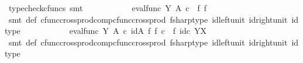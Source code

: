 \begin{isabellebody}
\ {\isacharparenleft}{\kern0pt}typecheck{\isacharunderscore}{\kern0pt}cfuncs{\isacharcomma}{\kern0pt}\ smt{\isacharparenright}{\kern0pt}\isanewline
\ \ \ \ \ \ \isamarkupfalse%
\ \isamarkupfalse%
\ {\isachardoublequoteopen}{\isachardot}{\kern0pt}{\isachardot}{\kern0pt}{\isachardot}{\kern0pt}\ {\isacharequal}{\kern0pt}\ eval{\isacharunderscore}{\kern0pt}func\ Y\ A\ {\isasymcirc}\isactrlsub c\ {\isacharparenleft}{\kern0pt}{\isasymphi}\ {\isasymtimes}\isactrlsub f\ f\isactrlsup {\isasymsharp}{\isacharparenright}{\kern0pt}{\isachardoublequoteclose}\isanewline
\ \ \ \ \ \ \ \ \isamarkupfalse%
\ {\isacharparenleft}{\kern0pt}smt\ {\isasymphi}{\isacharunderscore}{\kern0pt}def\ cfunc{\isacharunderscore}{\kern0pt}cross{\isacharunderscore}{\kern0pt}prod{\isacharunderscore}{\kern0pt}comp{\isacharunderscore}{\kern0pt}cfunc{\isacharunderscore}{\kern0pt}cross{\isacharunderscore}{\kern0pt}prod\ fsharp{\isacharunderscore}{\kern0pt}type\ id{\isacharunderscore}{\kern0pt}left{\isacharunderscore}{\kern0pt}unit{}\ id{\isacharunderscore}{\kern0pt}right{\isacharunderscore}{\kern0pt}unit{}\ id{\isacharunderscore}{\kern0pt}type{\isacharparenright}{\kern0pt}\isanewline
\ \ \ \ \ \ \isamarkupfalse%
\ \isamarkupfalse%
\ {\isachardoublequoteopen}{\isachardot}{\kern0pt}{\isachardot}{\kern0pt}{\isachardot}{\kern0pt}\ {\isacharequal}{\kern0pt}\ eval{\isacharunderscore}{\kern0pt}func\ Y\ A\ {\isasymcirc}\isactrlsub c\ {\isacharparenleft}{\kern0pt}id{\isacharparenleft}{\kern0pt}A{\isacharparenright}{\kern0pt}\ {\isasymtimes}\isactrlsub f\ f\isactrlsup {\isasymsharp}{\isacharparenright}{\kern0pt}\ {\isasymcirc}\isactrlsub c\ {\isacharparenleft}{\kern0pt}{\isasymphi}\ {\isasymtimes}\isactrlsub f\ id\isactrlsub c\ {\isacharparenleft}{\kern0pt}Y\isactrlbsup X\isactrlesup {\isacharparenright}{\kern0pt}{\isacharparenright}{\kern0pt}{\isachardoublequoteclose}\isanewline
\ \ \ \ \ \ \ \ \isamarkupfalse%
\ {\isacharparenleft}{\kern0pt}smt\ {\isasymphi}{\isacharunderscore}{\kern0pt}def\ cfunc{\isacharunderscore}{\kern0pt}cross{\isacharunderscore}{\kern0pt}prod{\isacharunderscore}{\kern0pt}comp{\isacharunderscore}{\kern0pt}cfunc{\isacharunderscore}{\kern0pt}cross{\isacharunderscore}{\kern0pt}prod\ fsharp{\isacharunderscore}{\kern0pt}type\ id{\isacharunderscore}{\kern0pt}left{\isacharunderscore}{\kern0pt}unit{}\ id{\isacharunderscore}{\kern0pt}right{\isacharunderscore}{\kern0pt}unit{}\ id{\isacharunderscore}{\kern0pt}type{\isacharparenright}{\kern0pt}\isanewline

\end{isabellebody}
